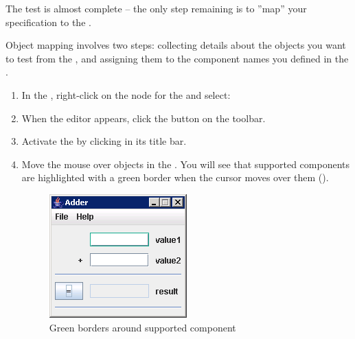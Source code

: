 The test is almost complete -- the only step remaining is to ''map'' your specification to the \gdaut{}. 

Object mapping involves two steps: collecting details about the objects you want to test from the 
\gdaut{},  and assigning them to the component names you defined in the \gdsteps{}. 

\begin{enumerate}
\item In the \gdtestsuitebrowser{}, right-click on the node for the  and select:\\
\item When the editor appears, click the  button on the toolbar.  
\item Activate the \gdaut{} by clicking in its title bar. 
\item Move the mouse over objects in the \gdaut{}. You will see that supported components are highlighted with a green border when the cursor moves over them ().

 \begin{figure}[h]
\begin{center}
\includegraphics{Tasks/Objectmapping/PS/greenborders}
\caption{Green borders around supported component}
\label{TutGreenBorders}
\end{center}
\end{figure}


\end{enumerate}
